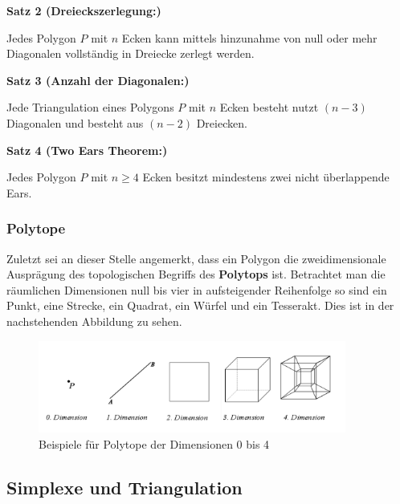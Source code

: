 \begin{flushleft}
{ \textbf{Satz 2 (Dreieckszerlegung:)}
  
  Jedes Polygon $P$ mit $n$ Ecken kann mittels hinzunahme von null oder mehr Diagonalen vollständig in Dreiecke zerlegt werden. \cite{newAlg}}
\end{flushleft}

\begin{flushleft}
  { \textbf{Satz 3 (Anzahl der Diagonalen:)}
  
  Jede Triangulation eines Polygons $P$ mit $n$ Ecken besteht nutzt $(n-3)$ Diagonalen und besteht aus $(n-2)$ Dreiecken. \cite{newAlg}
}
\end{flushleft}

\begin{flushleft}
  \textbf{Satz 4 (Two Ears Theorem:)}
  
  Jedes Polygon $P$ mit $n \geq 4$ Ecken besitzt mindestens zwei nicht überlappende Ears. \cite{twoears}
\end{flushleft}

\subsubsection{Polytope}
Zuletzt sei an dieser Stelle angemerkt, dass ein Polygon die zweidimensionale Ausprägung des topologischen Begriffs des \textbf{Polytops} ist.
Betrachtet man die räumlichen Dimensionen null bis vier in aufsteigender Reihenfolge so sind ein Punkt, eine Strecke, ein Quadrat, ein Würfel und ein Tesserakt.
Dies ist in der nachstehenden Abbildung zu sehen.

\begin{figure}[h]
  \centering
  \includegraphics[width=0.9\textwidth]{bilder/Polytope_Dim0_4.png}
  \caption[Beispiele für Polytope der Dimensionen 0 bis 4]{Beispiele für Polytope der Dimensionen 0 bis 4}
  \label{fig:polytope}
\end{figure}

\subsection{Simplexe und Triangulation}

